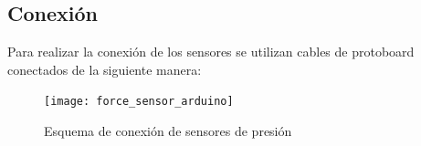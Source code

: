         \subsection{Conexión} %
        \label{sub:Conexion}

            Para realizar la conexión de los sensores se utilizan cables de protoboard conectados de la siguiente
            manera:

            \begin{figure}[ht]
                \centering
                \texttt{[image: force\_sensor\_arduino]}
                \caption{Esquema de conexión de sensores de presión}
            \end{figure}
        


